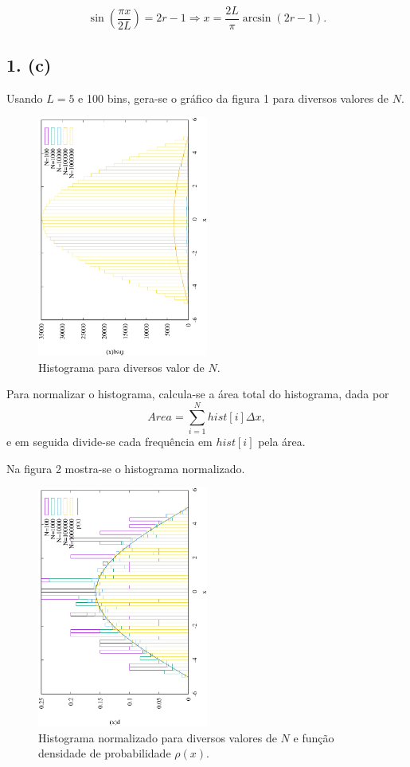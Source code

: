 \documentclass[brazilian, 12pt, a4paper, final]{article}
\begin{document}
\begin{equation*}
	\sin\left(\frac{\pi x}{2L}\right)=2r-1\Rightarrow x=\frac{2L}{\pi}\arcsin(2r-1).
\end{equation*}
	
\subsection*{1. (c)}
Usando $L=5$ e 100 bins, gera-se o gráfico da figura 1 para diversos valores de $N$.

\begin{figure}[htbp]
  \centering
  \includegraphics[width=0.5\textwidth,angle=-90]{Q1/HistQ1.eps}
  \caption{Histograma para diversos valor de $N$.}
\end{figure}

Para normalizar o histograma, calcula-se a área total do histograma, dada por
\begin{equation}
	Area=\sum_{i=1}^{N}hist[i]\Delta x,
\end{equation} 
e em seguida divide-se cada frequência em $hist[i]$ pela área.

Na figura 2 mostra-se o histograma normalizado.

\begin{figure}[htbp]
  \centering
  \includegraphics[width=0.5\textwidth,angle=-90]{Q1/NormQ1.eps}
  \caption{Histograma normalizado para diversos valores de $N$ e função densidade de probabilidade $\rho(x)$.}
\end{figure}
\end{document}
